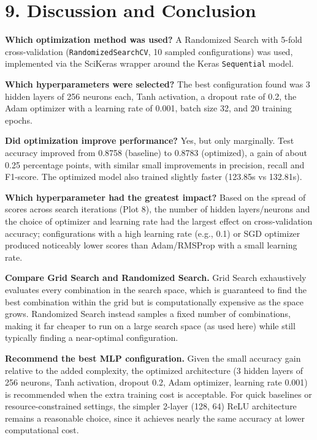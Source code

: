 \documentclass[11pt]{article}
\begin{document}
\section*{9. Discussion and Conclusion}

\textbf{Which optimization method was used?}
A Randomized Search with 5-fold cross-validation (\texttt{RandomizedSearchCV}, 10 sampled configurations) was used, implemented via the SciKeras wrapper around the Keras \texttt{Sequential} model.

\textbf{Which hyperparameters were selected?}
The best configuration found was 3 hidden layers of 256 neurons each, Tanh activation, a dropout rate of 0.2, the Adam optimizer with a learning rate of 0.001, batch size 32, and 20 training epochs.

\textbf{Did optimization improve performance?}
Yes, but only marginally. Test accuracy improved from 0.8758 (baseline) to 0.8783 (optimized), a gain of about 0.25 percentage points, with similar small improvements in precision, recall and F1-score. The optimized model also trained slightly faster (123.85s vs 132.81s).

\textbf{Which hyperparameter had the greatest impact?}
Based on the spread of scores across search iterations (Plot 8), the number of hidden layers/neurons and the choice of optimizer and learning rate had the largest effect on cross-validation accuracy; configurations with a high learning rate (e.g., 0.1) or SGD optimizer produced noticeably lower scores than Adam/RMSProp with a small learning rate.

\textbf{Compare Grid Search and Randomized Search.}
Grid Search exhaustively evaluates every combination in the search space, which is guaranteed to find the best combination within the grid but is computationally expensive as the space grows. Randomized Search instead samples a fixed number of combinations, making it far cheaper to run on a large search space (as used here) while still typically finding a near-optimal configuration.

\textbf{Recommend the best MLP configuration.}
Given the small accuracy gain relative to the added complexity, the optimized architecture (3 hidden layers of 256 neurons, Tanh activation, dropout 0.2, Adam optimizer, learning rate 0.001) is recommended when the extra training cost is acceptable. For quick baselines or resource-constrained settings, the simpler 2-layer (128, 64) ReLU architecture remains a reasonable choice, since it achieves nearly the same accuracy at lower computational cost.
\end{document}
